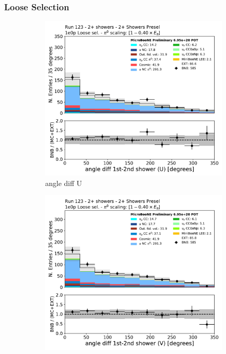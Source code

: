 \subsubsection{\zpsel Loose Selection}
\begin{figure}[H]
    \centering
    \begin{subfigure}{0.3\textwidth}
    \includegraphics[width=1.0\textwidth]{Sidebands/Figures/TwoShr_1e0pSel/loose/anglediff_U.pdf}
    \caption{angle diff U}
    \end{subfigure}
    \begin{subfigure}{0.3\textwidth}
    \includegraphics[width=1.0\textwidth]{Sidebands/Figures/TwoShr_1e0pSel/loose/anglediff_V.pdf}

\end{subfigure}
\end{figure}
